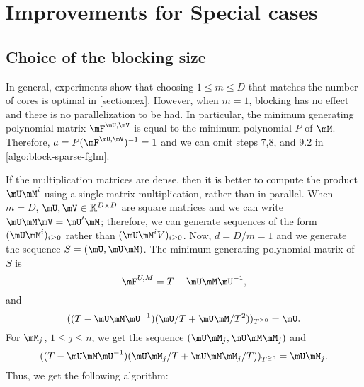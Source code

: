 \documentclass[12pt]{article}
\begin{document}
\newpage
\section{Improvements for Special cases}
\subsection{Choice of the blocking size}
In general, experiments show that choosing $1 \le m \le D$ that matches
the number of cores is optimal in \cref{section:ex}. However,
when $m=1$, blocking has no effect and there is no parallelization
to be had. In particular, the minimum generating polynomial matrix
$\mF^{\mU,\mV}$ is equal to the minimum polynomial $P$ of $\mM$. Therefore,
$a = P (\mF^{\mU,\mV})^{-1} = 1$ and we can omit steps 7,8, and 9.2 in
\cref{algo:block-sparse-fglm}.

If the multiplication matrices are dense, then it is
better to compute the product $\mU \mM^i$ using a single matrix multiplication,
rather than in parallel.
When $m = D$, $\mU,\mV \in \mathbb{K}^{D \times D}$ are square matrices
and we can write $\mU\mM\mV = \mU'\mM$; therefore, we can generate sequences of the
form $(\mU\mM^i)_{i\ge0}$ rather than $(\mU\mM^iV)_{i\ge0}$. Now, $d = D/m = 1$
and we generate the sequence $ S = (\mU, \mU\mM)$. The minimum generating polynomial
matrix of $S$ is 
$$\mF^{U,M} = T - \mU\mM\mU^{-1},$$ 
and 
$$((T - \mU\mM\mU^{-1})(\mU/T + \mU\mM/T^2))_{T^{\ge 0}} = \mU. $$
For $\mM_j$, $1 \le j \le n$, we get the sequence $(\mU\mM_j,\mU\mM\mM_j)$ and
$$((T - \mU\mM\mU^{-1})(\mU\mM_j/T + \mU\mM\mM_j/T))_{T^{\ge 0}} = \mU\mM_j.$$
Thus, we get the following algorithm:
\end{document}
